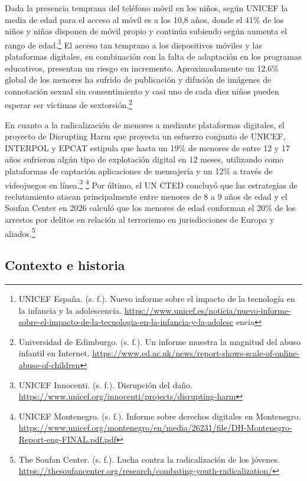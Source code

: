 Dada la presencia temprana del teléfono móvil en los niños, según UNICEF la media de edad para el acceso al móvil es a los 10,8 años, donde el 41\% de los niños y niñas disponen de móvil propio y continúa subiendo según aumenta el rango de edad.\footnote{UNICEF España. (s. f.). Nuevo informe sobre el impacto de la tecnología en la infancia y la adolescencia. \url{https://www.unicef.es/noticia/nuevo-informe-sobre-el-impacto-de-la-tecnologia-en-la-infancia-y-la-adolesc} encia} El acceso tan temprano a los dispositivos móviles y las plataformas digitales, en combinación con la falta de adaptación en los programas educativos, presentan un riesgo en incremento. Aproximadamente un 12.6\% global de los menores ha sufrido de publicación y difusión de imágenes de connotación sexual sin consentimiento y casi uno de cada diez niños pueden esperar ser víctimas de sextorsión.\footnote{Universidad de Edimburgo. (s. f.). Un informe muestra la magnitud del abuso infantil en Internet. \url{https://www.ed.ac.uk/news/report-shows-scale-of-online-abuse-of-children}}

En cuanto a la radicalización de menores a mediante plataformas digitales, el proyecto de Disrupting Harm que proyecta un esfuerzo conjunto de UNICEF, INTERPOL y EPCAT estipula que hasta un 19\% de menores de entre 12 y 17 años sufrieron algún tipo de explotación digital en 12 meses, utilizando como plataformas de captación aplicaciones de mensajería y un 12\% a través de videojuegos en línea.\footnote{UNICEF Innocenti. (s. f.). Disrupción del daño. \url{https://www.unicef.org/innocenti/projects/disrupting-harm}} \footnote{UNICEF Montenegro. (s. f.). Informe sobre derechos digitales en Montenegro. \url{https://www.unicef.org/montenegro/en/media/26231/file/DH-Montenegro-Report-eng-FINAL.pdf.pdf}} Por último, el UN CTED concluyó que las estrategias de reclutamiento atacan principalmente entre menores de 8 a 9 años de edad y el Soufan Center en 2026 calculó que los menores de edad conforman el 20\% de los arrestos por delitos en relación al terrorismo en jurisdicciones de Europa y aliados.\footnote{The Soufan Center. (s. f.). Lucha contra la radicalización de los jóvenes. \url{https://thesoufancenter.org/research/combating-youth-radicalization/}}

\subsection{Contexto e historia}

